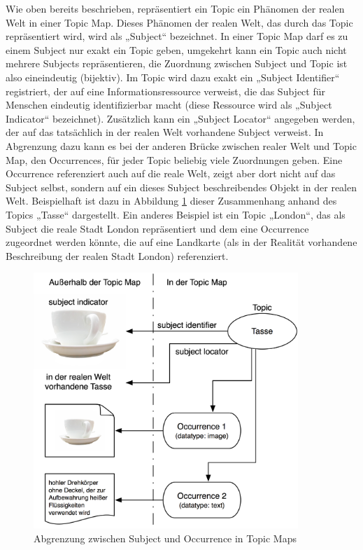 Wie oben bereits beschrieben, repräsentiert ein Topic ein Phänomen der realen Welt in einer Topic Map. Dieses Phänomen der realen Welt, das durch das Topic repräsentiert wird, wird als „Subject“ bezeichnet. In einer Topic Map darf es zu einem Subject nur exakt ein Topic geben, umgekehrt kann ein Topic auch nicht mehrere Subjects repräsentieren, die Zuordnung zwischen Subject und Topic ist also eineindeutig (bijektiv). Im Topic wird dazu exakt ein „Subject Identifier“ registriert, der auf eine Informationsressource verweist, die das Subject für Menschen eindeutig identifizierbar macht (diese Ressource wird als „Subject Indicator“ bezeichnet). Zusätzlich kann ein „Subject Locator“ angegeben werden, der auf das tatsächlich in der realen Welt vorhandene Subject verweist. In Abgrenzung dazu kann es bei der anderen Brücke zwischen realer Welt und Topic Map, den Occurrences, für jeder Topic beliebig viele Zuordnungen geben. Eine Occurrence referenziert auch auf die reale Welt, zeigt aber dort nicht auf das Subject selbst, sondern auf ein dieses Subject beschreibendes Objekt in der realen Welt. Beispielhaft ist dazu in Abbildung \ref{fig:img_Persistenz_SubjectVsOccurrence} dieser Zusammenhang anhand des Topics „Tasse“ dargestellt. Ein anderes Beispiel ist ein Topic „London“, das als Subject die reale Stadt London repräsentiert und dem eine Occurrence zugeordnet werden könnte, die auf eine Landkarte (als in der Realität vorhandene Beschreibung der realen Stadt London) referenziert.

\begin{figure}[htbp]
	\centering
		\includegraphics[width=10cm]{img/Persistenz/SubjectVsOccurrence.png}
	\caption{Abgrenzung zwischen Subject und Occurrence in Topic Maps}
	\label{fig:img_Persistenz_SubjectVsOccurrence}
\end{figure}

